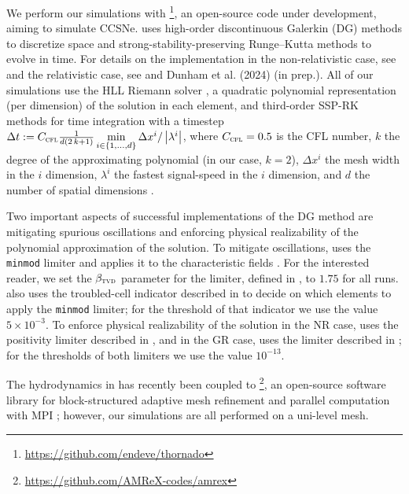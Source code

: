 We perform our simulations with \thornado{}%
\footnote{\url{https://github.com/endeve/thornado}},
an open-source code under development,
aiming to simulate CCSNe.
\thornado{} uses high-order discontinuous Galerkin (DG) methods
to discretize space and strong-stability-preserving Runge--Kutta
 methods
to evolve in time.
For details on the implementation in the non-relativistic case,
see \citet{ebd2019} and \citet{pbe2021} the relativistic case, see \citet{dem2020} and
Dunham et al. (2024) (in prep.).
All of our simulations use the HLL Riemann solver \citep{hll1983},
a quadratic polynomial representation (per dimension) of the
solution in each element, and
third-order SSP-RK methods for time integration \citep{gst2001}
with a timestep
$\Delta t
:=C_{\textsc{cfl}}
\frac{1}{d\left(2\,k+1\right)}
\min\limits_{i\in\left\{1,\ldots,d\right\}}
\Delta x^{i}/\left|\lambda^{i}\right|$,
where $C_{\textsc{cfl}}=0.5$ is the CFL number,
$k$ the degree of the approximating polynomial (in our case, $k=2$),
$\Delta x^{i}$ the mesh width in the $i$\th{} dimension,
$\lambda^{i}$ the fastest signal-speed in the $i$\th{} dimension,
and $d$ the number of spatial dimensions \citep{cs2001}.

Two important aspects of successful implementations of
the DG method are mitigating spurious
oscillations and enforcing physical realizability
of the polynomial approximation of the solution.
To mitigate oscillations, \thornado{} uses the \texttt{minmod}
limiter and applies it to the characteristic fields
\citep[see, e.g.,][]{s1987,pbe2021}.
For the interested reader, we set the $\beta_{\textsc{tvd}}$ parameter
for the limiter, defined in \citet{pbe2021}, to $1.75$ for all runs.
\thornado{} also uses the troubled-cell indicator described
in \cite{fs2017} to decide on which
elements to apply the \texttt{minmod} limiter;
for the threshold of that indicator
we use the value $5\times10^{-3}$.
To enforce physical realizability of the solution in the NR case,
\thornado{} uses the positivity limiter described in \citet{zs2010},
and in the GR case, uses the limiter described in \citet{qsy2016};
for the thresholds of both limiters we use the value $10^{-13}$.

The hydrodynamics in \thornado{} has recently been coupled to
\amrex{}\footnote{\url{https://github.com/AMReX-codes/amrex}},
an open-source software library for block-structured adaptive
mesh refinement and parallel computation with MPI \citep{z2019};
however, our simulations are all performed on a uni-level mesh.

